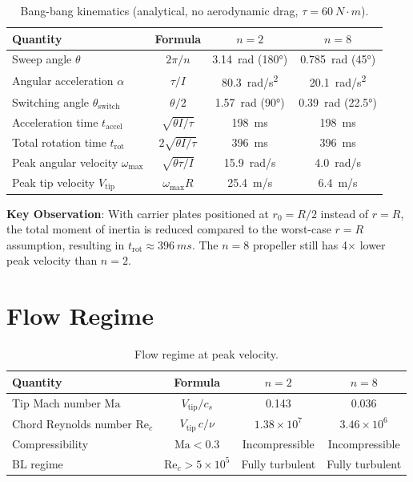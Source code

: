 \documentclass[11pt,a4paper]{article}
\begin{document}
\begin{table}[H]
\centering
\caption{Bang-bang kinematics (analytical, no aerodynamic drag, $\tau = \SI{60}{N\cdot m}$).}
\label{tab:kinematics}
\begin{tabular}{lccc}
\toprule
Quantity & Formula & $n = 2$ & $n = 8$ \\
\midrule
Sweep angle $\theta$ & $2\pi/n$
  & \SI{3.14}{rad} (180°) & \SI{0.785}{rad} (45°) \\
Angular acceleration $\alpha$ & $\tau/I$
  & \SI{80.3}{rad/s^2} & \SI{20.1}{rad/s^2} \\
Switching angle $\theta_\mathrm{switch}$ & $\theta/2$
  & \SI{1.57}{rad} (90°) & \SI{0.39}{rad} (22.5°) \\
Acceleration time $t_\mathrm{accel}$ & $\sqrt{\theta I / \tau}$
  & \SI{198}{ms} & \SI{198}{ms} \\
Total rotation time $t_\mathrm{rot}$ & $2\sqrt{\theta I / \tau}$
  & \SI{396}{ms} & \SI{396}{ms} \\
Peak angular velocity $\omega_\mathrm{max}$ & $\sqrt{\theta\tau/I}$
  & \SI{15.9}{rad/s} & \SI{4.0}{rad/s} \\
Peak tip velocity $V_\mathrm{tip}$ & $\omega_\mathrm{max} R$
  & \SI{25.4}{m/s} & \SI{6.4}{m/s} \\
\bottomrule
\end{tabular}
\end{table}

\textbf{Key Observation}: With carrier plates positioned at $r_0 = R/2$
instead of $r = R$, the total moment of inertia is reduced compared to
the worst-case $r = R$ assumption, resulting in $t_\mathrm{rot} \approx \SI{396}{ms}$.
The $n = 8$ propeller still has 4$\times$ lower peak velocity than $n = 2$.


\section{Flow Regime}
\label{sec:results_regime}

\begin{table}[H]
\centering
\caption{Flow regime at peak velocity.}
\label{tab:regime}
\begin{tabular}{lccc}
\toprule
Quantity & Formula & $n = 2$ & $n = 8$ \\
\midrule
Tip Mach number $\mathrm{Ma}$ & $V_\mathrm{tip}/c_s$
  & 0.143 & 0.036 \\
Chord Reynolds number $\mathrm{Re}_c$ & $V_\mathrm{tip}\,c/\nu$
  & $1.38 \times 10^7$ & $3.46 \times 10^6$ \\
\midrule
Compressibility & $\mathrm{Ma} < 0.3$ & Incompressible & Incompressible \\
BL regime & $\mathrm{Re}_c > 5 \times 10^5$ & Fully turbulent & Fully turbulent \\
\bottomrule
\end{tabular}
\end{table}
\end{document}
